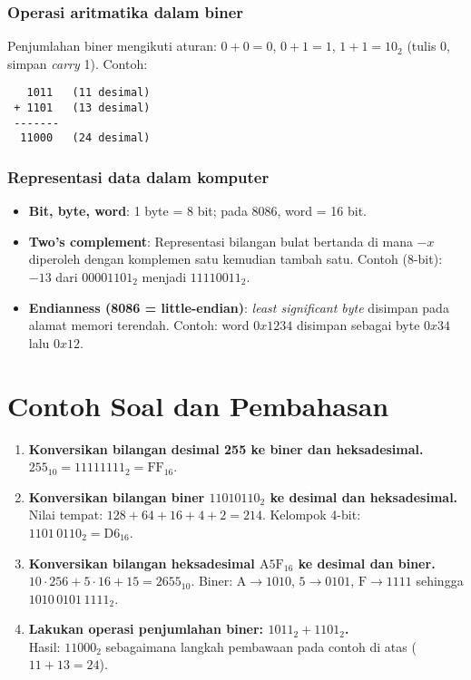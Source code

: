 \subsubsection{Operasi aritmatika dalam biner}
Penjumlahan biner mengikuti aturan: \(0+0=0\), \(0+1=1\), \(1+1=10_2\) (tulis 0, simpan \textit{carry} 1). Contoh:
\begin{verbatim}
   1011   (11 desimal)
 + 1101   (13 desimal)
 -------
  11000   (24 desimal)
\end{verbatim}

\subsubsection{Representasi data dalam komputer}
\begin{itemize}
  \item \textbf{Bit, byte, word}: 1 byte = 8 bit; pada 8086, word = 16 bit.
  \item \textbf{Two's complement}: Representasi bilangan bulat bertanda di mana \(-x\) diperoleh dengan komplemen satu kemudian tambah satu. Contoh (8-bit): \(-13\) dari \(00001101_2\) menjadi \(11110011_2\).
  \item \textbf{Endianness (8086 = little-endian)}: \textit{least significant byte} disimpan pada alamat memori terendah. Contoh: word \(0x1234\) disimpan sebagai byte \(0x34\) lalu \(0x12\).
\end{itemize}

\section{Contoh Soal dan Pembahasan}
\begin{enumerate}
  \item \textbf{Konversikan bilangan desimal 255 ke biner dan heksadesimal.}\\
  \(255_{10} = 11111111_2 = \mathrm{FF}_{16}\).

  \item \textbf{Konversikan bilangan biner \(11010110_2\) ke desimal dan heksadesimal.}\\
  Nilai tempat: \(128+64+16+4+2 = 214\). Kelompok 4-bit: \(1101\,0110_2 = \mathrm{D6}_{16}\).

  \item \textbf{Konversikan bilangan heksadesimal \(\mathrm{A5F}_{16}\) ke desimal dan biner.}\\
  \(10\cdot 256 + 5\cdot 16 + 15 = 2655_{10}\). Biner: \(\mathrm{A}\to 1010\), \(\mathrm{5}\to 0101\), \(\mathrm{F}\to 1111\) sehingga \(1010\,0101\,1111_2\).

  \item \textbf{Lakukan operasi penjumlahan biner: \(1011_2 + 1101_2\).}\\
  Hasil: \(11000_2\) sebagaimana langkah pembawaan pada contoh di atas (\(11+13=24\)).
\end{enumerate}

